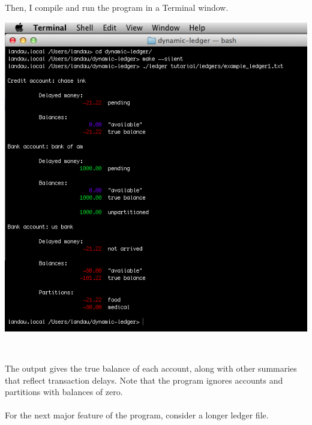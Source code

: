 \documentclass{article}
\providecommand{\q}{$\quad$ \newline}
\begin{document}
\begin{flushleft}
Then, I compile and run the program in a Terminal window. \q

\begin{center}
\includegraphics[scale=.65]{fig/open3.png}
\end{center} \q

The output gives the true balance of each account, along with other summaries that reflect transaction delays. Note that the program ignores accounts and partitions with balances of zero. 


\paragraph{} For the next major feature of the program, consider a longer ledger file.


\end{flushleft}
\end{document}

